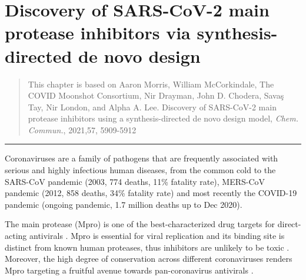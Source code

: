 \chapter{Discovery of SARS-CoV-2 main protease inhibitors via synthesis-directed de novo design} \label{ch:ranking}

\begin{quote}
 This chapter is based on Aaron Morris, William McCorkindale, The COVID Moonshot Consortium, Nir Drayman, John D. Chodera, Savaş Tay, Nir London, and Alpha A. Lee. Discovery of SARS-CoV-2 main protease inhibitors using a synthesis-directed de novo design model, \textit{Chem. Commun.}, 2021,57, 5909-5912 
\end{quote}

\noindent\hfil\rule{0.5\textwidth}{.4pt}\hfil


Coronaviruses are a family of pathogens that are frequently associated with serious and highly infectious human diseases, from the common cold to the SARS-CoV pandemic (2003, 774 deaths, 11\% fatality rate), MERS-CoV pandemic (2012, 858 deaths, 34\% fatality rate) and most recently the COVID-19 pandemic (ongoing pandemic, 1.7 million deaths up to Dec 2020).

The main protease (Mpro) is one of the best-characterized drug targets for direct-acting antivirals \cite{pillaiyar2016overview,cannalire2020targeting}. Mpro is essential for viral replication and its binding site is distinct from known human proteases, thus inhibitors are unlikely to be toxic \cite{jin2020structure,liu2020development}. Moreover, the high degree of conservation across different coronaviruses renders Mpro targeting a fruitful avenue towards pan-coronavirus antivirals \cite{ullrich2020sars}. 


